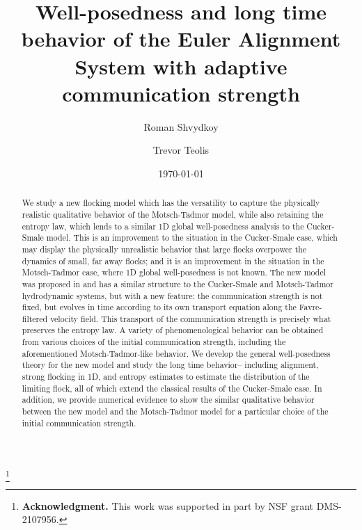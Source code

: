 \documentclass[11pt,letterpaper]{amsart}
\theoremstyle{plain}
\theoremstyle{definition}
\theoremstyle{remark}
\begin{document}
\title[Euler Alignment system with adaptive strength]{Well-posedness and long time behavior of the Euler Alignment System with adaptive communication strength}



\author{Roman Shvydkoy}

\address{851 S Morgan St, M/C 249, Department of Mathematics, Statistics and Computer Science, University of Illinois at Chicago, Chicago, IL 60607}


 \author{Trevor Teolis}
 
 
\address{851 S Morgan St, M/C 249, Department of Mathematics, Statistics and Computer Science, University of Illinois at Chicago, Chicago, IL 60607}

 

\date{\today}



\thanks{\textbf{Acknowledgment.}  
	This work was  supported in part by NSF
	grant  DMS-2107956.}


\begin{abstract}
We study a new flocking model which has the versatility to capture the physically realistic qualitative behavior of the Motsch-Tadmor model, while 
also retaining the entropy law, which lends to a similar 1D global well-posedness analysis to the Cucker-Smale model.  
This is an improvement to the situation in the Cucker-Smale case, which may display the physically unrealistic behavior that large flocks overpower the dynamics of small, far away flocks; 
and it is an improvement in the situation in the Motsch-Tadmor case, where 1D global well-posedness is not known.
The new model was proposed in \cite{shvydkoy2022environmental} and has a similar structure to the Cucker-Smale and Motsch-Tadmor hydrodynamic systems, but 
with a new feature: the communication strength is not fixed, but evolves in time according 
to its own transport equation along the Favre-filtered velocity field.  This transport of the communication strength is precisely what preserves the entropy law. 
A variety of phenomenological behavior can be obtained from various choices of the initial communication strength, including the aforementioned Motsch-Tadmor-like behavior. 
We develop the general well-posedness theory for the new model and study the long time behavior-- including alignment, strong flocking in 1D, and entropy estimates to 
estimate the distribution of the limiting flock, all of which extend the classical results of the Cucker-Smale case. 
In addition, we provide numerical evidence to show the similar qualitative behavior
between the new model and the Motsch-Tadmor model for a particular choice of the initial communication strength.   
\end{abstract}
\end{document}
